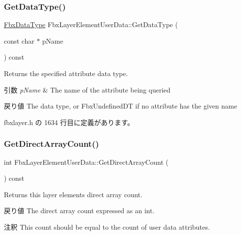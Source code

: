\subsubsection{\texorpdfstring{Get\+Data\+Type()}{GetDataType()}\hspace{0.1cm}{\footnotesize\ttfamily [2/2]}}
{\footnotesize\ttfamily \hyperlink{class_fbx_data_type}{Fbx\+Data\+Type} Fbx\+Layer\+Element\+User\+Data\+::\+Get\+Data\+Type (\begin{DoxyParamCaption}\item[{const char $\ast$}]{p\+Name }\end{DoxyParamCaption}) const\hspace{0.3cm}{\ttfamily [inline]}}

Returns the specified attribute data type. 
\begin{DoxyParams}{引数}
{\em p\+Name} & The name of the attribute being queried \\
\hline
\end{DoxyParams}
\begin{DoxyReturn}{戻り値}
The data type, or Fbx\+Undefined\+DT if no attribute has the given name 
\end{DoxyReturn}


 fbxlayer.\+h の 1634 行目に定義があります。

\mbox{\label{class_fbx_layer_element_user_data_a5f7f18cd0b66e1868f9307129f45f51d}} 
\subsubsection{\texorpdfstring{Get\+Direct\+Array\+Count()}{GetDirectArrayCount()}}
{\footnotesize\ttfamily int Fbx\+Layer\+Element\+User\+Data\+::\+Get\+Direct\+Array\+Count (\begin{DoxyParamCaption}{ }\end{DoxyParamCaption}) const\hspace{0.3cm}{\ttfamily [inline]}}

Returns this layer element\textquotesingle{}s direct array count. \begin{DoxyReturn}{戻り値}
The direct array count expressed as an int. 
\end{DoxyReturn}
\begin{DoxyRemark}{注釈}
This count should be equal to the count of user data attributes. 
\end{DoxyRemark}


